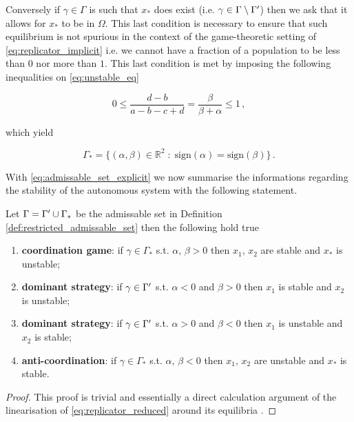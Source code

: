 \documentclass[../main.tex]{subfiles}
\begin{document}
Conversely if $\gamma\in\Gamma$ is such that $x_{*}$ does exist (i.e. $\gamma\in\Gamma\setminus \Gamma'$) then we ask that it allows for $x_{*}$ to be in $\Omega$.
This last condition is necessary to ensure that such equilibrium is not spurious in the context of the game-theoretic setting of \eqref{eq:replicator_implicit} i.e. we cannot have a fraction of a population to be less than $0$ nor more than $1$.
This last condition is met by imposing the following inequalities on \eqref{eq:unstable_eq}

\begin{equation*}
     0 \leq \frac{d-b}{a -b -c + d} = \frac{\beta}{\beta + \alpha} \leq 1\,,
\end{equation*}

which yield

\begin{equation}\label{eq:admissable_set_explicit}
        \Gamma_{*} = \{(\alpha,\beta)\in \mathbb{R}^{2}\;:\; \text{sign}(\alpha)=\text{sign}(\beta)\}\,.
\end{equation}

With \eqref{eq:admissable_set_explicit} we now summarise the informations regarding the stability of the autonomous system with the following statement.

\begin{lemma}\label{lemma:stability}
     Let $\Gamma=\Gamma'\cup\Gamma_{*}$ be the admissable set in Definition \ref{def:restricted_admissable_set} then the following hold true
     \begin{enumerate}
          \item \textbf{coordination game}: if $\gamma\in\Gamma_{*}$ s.t. $\alpha,\,\beta>0$ then $x_{1},\,x_{2}$ are stable and $x_{*}$ is unstable;
          \item \textbf{dominant strategy}: if $\gamma\in\Gamma'$ s.t. $\alpha<0$ and $\beta>0$ then $x_{1}$ is stable and $x_{2}$ is unstable;
          \item \textbf{dominant strategy}: if $\gamma\in\Gamma'$ s.t. $\alpha>0$ and $\beta<0$ then $x_{1}$ is unstable and $x_{2}$ is stable;
          \item \textbf{anti-coordination}: if $\gamma\in\Gamma_{*}$ s.t. $\alpha,\,\beta<0$ then $x_{1},\,x_{2}$ are unstable and $x_{*}$ is stable.
     \end{enumerate}
\end{lemma}

\begin{proof}
        This proof is trivial and essentially a direct calculation argument of the linearisation of \eqref{eq:replicator_reduced} around its equilibria \cite[Appendix A, p. 15]{Zino25}.
\end{proof}
\end{document}
